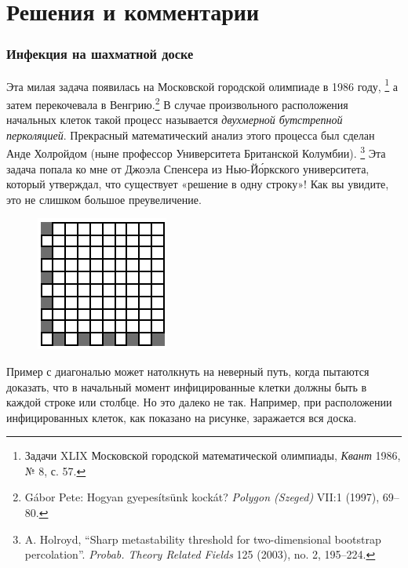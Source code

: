 \section*{Решения и комментарии}

\subsubsection*{Инфекция на шахматной доске}%

{\sloppy

Эта милая задача появилась на Московской городской олимпиаде в 1986 году,%
\footnote{Задачи XLIX Московской городской математической олимпиады, \emph{Квант} 1986, № 8, с. 57.}
а затем перекочевала в Венгрию.\footnote{Gábor Pete: Hogyan gyepesítsünk kockát? \emph{Polygon (Szeged)} VII:1 (1997), 69--80.}
В случае произвольного расположения начальных клеток такой процесс называется \emph{двухмерной бутстрепной перколяцией}.
Прекрасный математический анализ этого процесса был сделан Анде Холройдом (ныне профессор Университета Британской Колумбии).%
\footnote{A. Holroyd, ``Sharp metastability threshold for two-dimensional bootstrap percolation''. \emph{Probab. Theory Related Fields} 125 (2003), no. 2, 195--224.}
Эта задача попала ко мне от Джоэла Спенсера %
из Нью-Й\'{о}ркского университета, который утверждал, что существует «решение в одну строку»!
Как вы увидите, это не слишком большое преувеличение.

}

\begin{figure}
\vskip-3mm
\centering
\includegraphics[scale=1.5]{Figs/Algorithms/sick}
\end{figure}

\medskip

Пример с диагональю может натолкнуть на неверный путь, когда пытаются доказать, что в начальный момент инфицированные клетки должны быть в каждой строке или столбце.
Но это далеко не так.
Например, при расположении инфицированных клеток, как показано на рисунке, заражается вся доска.


